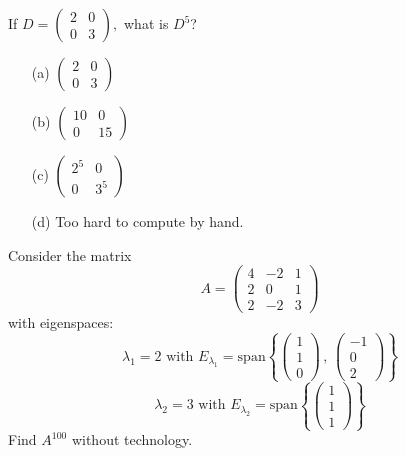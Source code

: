 \begin{problem}
    If $D = \left( \begin{array}{cc} 2 & 0 \\ 0 & 3 \end{array} \right),$ what is $D^5$?
\begin{enumerate}
    \item[(a)] $\left( \begin{array}{cc}
2 & 0 \\
0 & 3 \end{array} \right)$ 
\item[(b)] $\left( \begin{array}{cc}
10 & 0 \\
0 & 15 \end{array} \right)$ 
\item[(c)] $\left( \begin{array}{cc}
2^5 & 0 \\
0 & 3^5 \end{array} \right)$ 
\item[(d)] Too hard to compute by hand.
\end{enumerate}


\end{problem}
%             


\begin{problem}
    Consider the matrix
    \[ A = \begin{pmatrix} 4 & -2 & 1 \\ 2 & 0 & 1 \\ 2 & -2 & 3 \end{pmatrix} \]
    with eigenspaces:
    \[ \lambda_1 = 2 \text{ with } E_{\lambda_1} = \text{span}\left\{ \begin{pmatrix}
            1\\1\\0\end{pmatrix} \, , \, \begin{pmatrix}-1\\0\\2\end{pmatrix} \right\} \]
    \[ \lambda_2 = 3 \text{ with } E_{\lambda_2} = \text{span}\left\{ \begin{pmatrix}
            1\\1\\1\end{pmatrix} \right\} \]
    Find $A^{100}$ without technology.
\end{problem}



